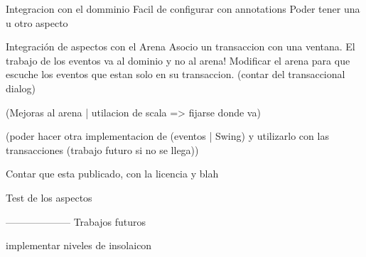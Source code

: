 Integracion con el domminio
	Facil de configurar con annotations
	Poder tener una u otro aspecto 


Integración de aspectos con el Arena
	Asocio un transaccion con una ventana.
	El trabajo de los eventos va al dominio y no al arena!
	Modificar el arena para que escuche los eventos que estan solo en su
	transaccion. (contar del transaccional dialog)
	

(Mejoras al arena | utilacion de scala => fijarse donde va)
	
	
(poder hacer otra implementacion de (eventos | Swing) y utilizarlo con las
transacciones (trabajo futuro si no se llega))

Contar que esta publicado, con la licencia y blah

Test de los aspectos




--------------------
Trabajos futuros

implementar niveles de insolaicon


